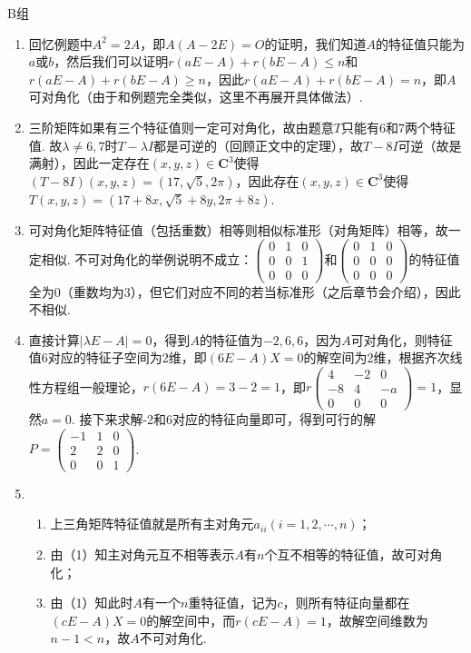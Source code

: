 \centerline{\heiti B组}
\begin{enumerate}
    \item 回忆例题中$A^2=2A$，即$A(A-2E)=O$的证明，我们知道$A$的特征值只能为$a$或$b$，然后我们可以证明$r(aE-A)+r(bE-A)\leqslant n$和$r(aE-A)+r(bE-A)\geqslant n$，因此$r(aE-A)+r(bE-A)=n$，即$A$可对角化（由于和例题完全类似，这里不再展开具体做法）.

    \item 三阶矩阵如果有三个特征值则一定可对角化，故由题意$T$只能有6和7两个特征值. 故$\lambda\neq 6,7$时$T-\lambda I$都是可逆的（回顾正文中的定理），故$T-8I$可逆（故是满射），因此一定存在$(x,y,z)\in\mathbf{C}^3$使得$(T-8I)(x,y,z)=(17,\sqrt{5},2\pi)$，因此存在$(x,y,z)\in\mathbf{C}^3$使得$T(x,y,z)=(17+8x,\sqrt{5}+8y,2\pi+8z)$.

    \item 可对角化矩阵特征值（包括重数）相等则相似标准形（对角矩阵）相等，故一定相似. 不可对角化的举例说明不成立：$\begin{pmatrix}
        0 & 1 & 0 \\ 0 & 0 & 1 \\ 0 & 0 & 0
    \end{pmatrix}$和$\begin{pmatrix}
        0 & 1 & 0 \\ 0 & 0 & 0 \\ 0 & 0 & 0
    \end{pmatrix}$的特征值全为0（重数均为3），但它们对应不同的若当标准形（之后章节会介绍），因此不相似.

    \item 直接计算$|\lambda E-A|=0$，得到$A$的特征值为$-2,6,6$，因为$A$可对角化，则特征值6对应的特征子空间为2维，即$(6E-A)X=0$的解空间为2维，根据齐次线性方程组一般理论，$r(6E-A)=3-2=1$，即$r\begin{pmatrix}
        4 & -2 & 0 \\ -8 & 4 & -a \\ 0 & 0 & 0
    \end{pmatrix}=1$，显然$a=0$. 接下来求解-2和6对应的特征向量即可，得到可行的解$P=\begin{pmatrix}
        -1 & 1 & 0 \\ 2 & 2 & 0 \\ 0 & 0 & 1
    \end{pmatrix}$.

    \item \begin{enumerate}
        \item 上三角矩阵特征值就是所有主对角元$a_{ii}(i=1,2,\cdots,n)$；
        \item 由（1）知主对角元互不相等表示$A$有$n$个互不相等的特征值，故可对角化；
        \item 由（1）知此时$A$有一个$n$重特征值，记为$c$，则所有特征向量都在$(cE-A)X=0$的解空间中，而$r(cE-A)=1$，故解空间维数为$n-1<n$，故$A$不可对角化.
    \end{enumerate}


\end{enumerate}
